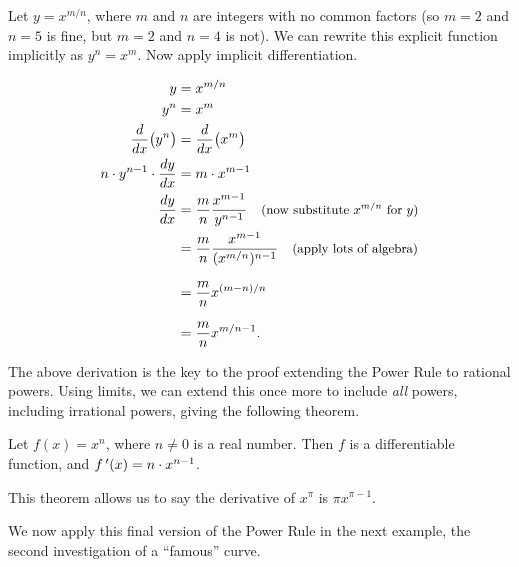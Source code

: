Let $y = x^{m/n}$, where $m$ and $n$ are integers with no common factors (so $m=2$ and $n=5$ is fine, but $m=2$ and $n=4$ is not). We can rewrite this explicit function implicitly as $y^n = x^m$. Now apply implicit differentiation.

\begin{align*}
y &= x^{m/n} \\
y^n &= x^m \\
\frac{d}{dx}\big(y^n\big) &= \frac{d}{dx}\big(x^m\big) \\
n\cdot y^{n-1}\cdot \frac{dy}{dx} &= m\cdot x^{m-1} \\
\frac{dy}{dx} 	&= \frac{m}{n} \frac{x^{m-1}}{y^{n-1}} \quad \mbox{\small (now substitute $x^{m/n}$ for $y$)} \\
 		&= \frac{m}{n} \frac{x^{m-1}}{(x^{m/n})^{n-1}} \quad \mbox{\small (apply lots of algebra)}\\
		&= \frac{m}n x^{(m-n)/n}\rule{0pt}{18pt}\\
		&= \frac{m}n x^{m/n -1}.\rule{0pt}{18pt}
\end{align*}

The above derivation is the key to the proof extending the Power Rule to rational powers. Using limits, we can extend this once more to include \textit{all} powers, including irrational powers, giving the following theorem.

{Let $f(x) = x^n$, where $n\neq 0$ is a real number. Then $f$ is a differentiable function, and $f\,'(x) = n\cdot x^{n-1}$.
}

This theorem allows us to say the derivative of $x^\pi$ is $\pi x^{\pi -1}$. 

We now apply this final version of the Power Rule in the next example, the second investigation of a ``famous'' curve.\\

